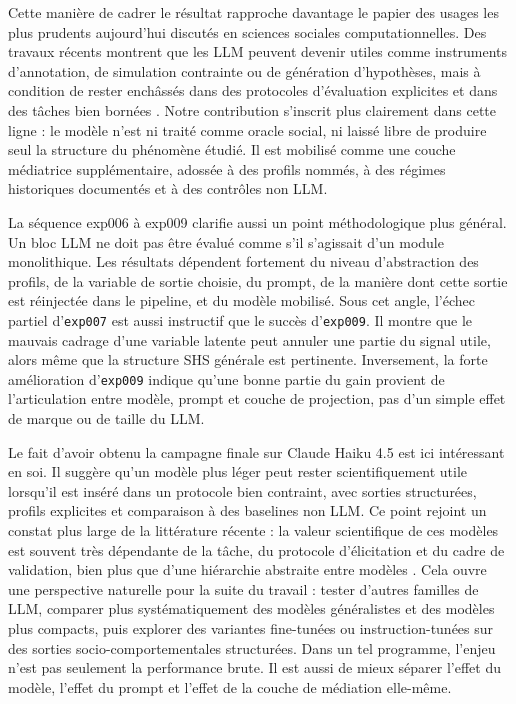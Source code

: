 \documentclass[ROIA,Unicode]{cedram}
\begin{document}
Cette manière de cadrer le résultat rapproche davantage le papier des usages les plus prudents aujourd'hui discutés en sciences sociales computationnelles. Des travaux récents montrent que les LLM peuvent devenir utiles comme instruments d'annotation, de simulation contrainte ou de génération d'hypothèses, mais à condition de rester enchâssés dans des protocoles d'évaluation explicites et dans des tâches bien bornées \citep{argyle2023out,park2023generative,horton2023homo,ziems2024css}. Notre contribution s'inscrit plus clairement dans cette ligne : le modèle n'est ni traité comme oracle social, ni laissé libre de produire seul la structure du phénomène étudié. Il est mobilisé comme une couche médiatrice supplémentaire, adossée à des profils nommés, à des régimes historiques documentés et à des contrôles non LLM.

La séquence exp006 à exp009 clarifie aussi un point méthodologique plus général. Un bloc LLM ne doit pas être évalué comme s'il s'agissait d'un module monolithique. Les résultats dépendent fortement du niveau d'abstraction des profils, de la variable de sortie choisie, du prompt, de la manière dont cette sortie est réinjectée dans le pipeline, et du modèle mobilisé. Sous cet angle, l'échec partiel d'\texttt{exp007} est aussi instructif que le succès d'\texttt{exp009}. Il montre que le mauvais cadrage d'une variable latente peut annuler une partie du signal utile, alors même que la structure SHS générale est pertinente. Inversement, la forte amélioration d'\texttt{exp009} indique qu'une bonne partie du gain provient de l'articulation entre modèle, prompt et couche de projection, pas d'un simple effet de marque ou de taille du LLM.

Le fait d'avoir obtenu la campagne finale sur Claude Haiku 4.5 est ici intéressant en soi. Il suggère qu'un modèle plus léger peut rester scientifiquement utile lorsqu'il est inséré dans un protocole bien contraint, avec sorties structurées, profils explicites et comparaison à des baselines non LLM. Ce point rejoint un constat plus large de la littérature récente : la valeur scientifique de ces modèles est souvent très dépendante de la tâche, du protocole d'élicitation et du cadre de validation, bien plus que d'une hiérarchie abstraite entre modèles \citep{ziems2024css}. Cela ouvre une perspective naturelle pour la suite du travail : tester d'autres familles de LLM, comparer plus systématiquement des modèles généralistes et des modèles plus compacts, puis explorer des variantes fine-tunées ou instruction-tunées sur des sorties socio-comportementales structurées. Dans un tel programme, l'enjeu n'est pas seulement la performance brute. Il est aussi de mieux séparer l'effet du modèle, l'effet du prompt et l'effet de la couche de médiation elle-même.
\end{document}
